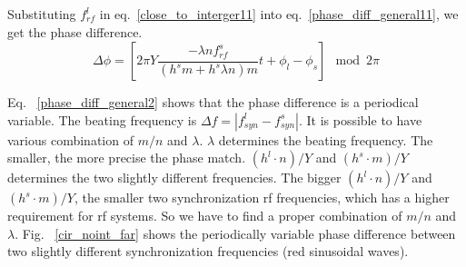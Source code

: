 Substituting $f_{\mathit{rf}}^{l}$ in eq.~\ref{close_to_interger11} into eq.~\ref{phase_diff_general11}, we get the phase difference.
\begin{equation}
	\Delta \phi=[2\pi Y\frac{-\lambda n f_{\mathit{rf}}^{s}}{(h^{s}m+h^{s}\lambda n)m}t+\phi_l-\phi_s] \mod 2\pi \label{phase_diff_general23}
\end{equation}

Eq. ~\ref{phase_diff_general2} shows that the phase difference is a periodical variable. The beating frequency is $\Delta f=|f_{\mathit{syn}}^{l}-f_{\mathit{syn}}^{s}|$. It is possible to have various combination of $m/n$ and $\lambda$. $\lambda$ determines the beating frequency. The smaller, the more precise the phase match. $(h^l\cdot n)/Y$ and $(h^s\cdot m)/Y$ determines the two slightly different frequencies. The bigger $(h^l\cdot n)/Y$ and $(h^s\cdot m)/Y$, the smaller two synchronization rf frequencies, which has a higher requirement for rf systems. So we have to find a proper combination of $m/n$ and $\lambda$. Fig. ~\ref{cir_noint_far} shows the periodically variable phase difference between two slightly different synchronization frequencies (red sinusoidal waves).



